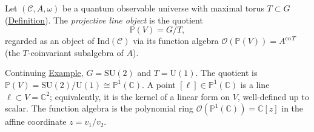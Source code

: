 \begin{definition}
  \label{def:projective-line-object}
Let $(\mathcal{C}, A, \omega)$ be a quantum observable universe with
maximal torus $T \subset G$ (\hyperref[def:maximal-torus]{Definition}).
The \emph{projective line object} is the quotient
\[
\mathbb{P}(V) = G / T,
\]
regarded as an object of $\mathrm{Ind}(\mathcal{C})$ via its function
algebra $\mathcal{O}(\mathbb{P}(V)) = A^{\mathrm{co}\,T}$
(the $T$-coinvariant subalgebra of $A$).
\end{definition}

\begin{example}
  \label{ex:projective-line-su2}
Continuing \hyperref[ex:maximal-torus-su2]{Example},
$G = \mathrm{SU}(2)$ and $T = \mathrm{U}(1)$.
The quotient is
$\mathbb{P}(V) = \mathrm{SU}(2)/\mathrm{U}(1) \cong \mathbb{P}^1(\mathbb{C})$.
A point $[\ell] \in \mathbb{P}^1(\mathbb{C})$ is a line $\ell \subset V = \mathbb{C}^2$;
equivalently, it is the kernel of a linear form on $V$, well-defined up
to scalar. The function algebra is the polynomial ring
$\mathcal{O}(\mathbb{P}^1(\mathbb{C})) = \mathbb{C}[z]$ in the affine coordinate
$z = v_1 / v_2$.
\end{example}

